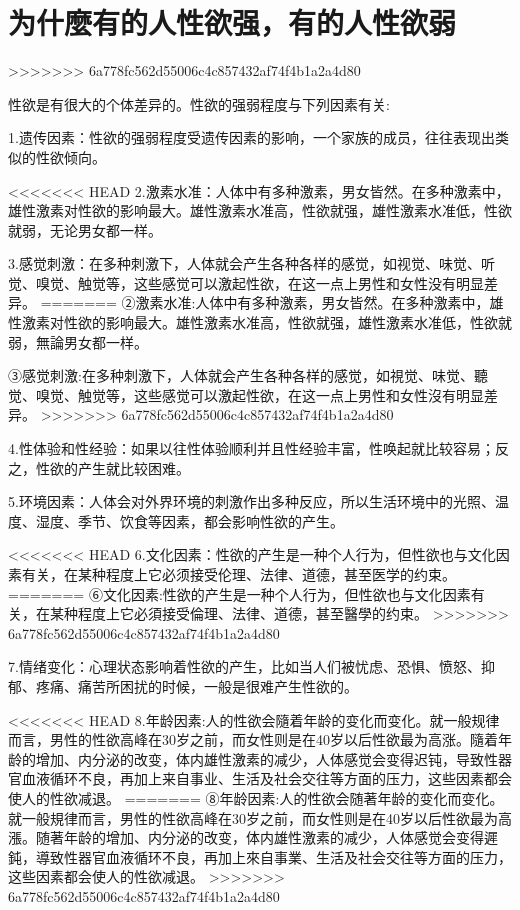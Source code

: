 \documentclass[12pt,UTF8]{ctexbook}
\begin{document}
\section{为什麼有的人性欲强，有的人性欲弱}
>>>>>>> 6a778fc562d55006c4c857432af74f4b1a2a4d80

性欲是有很大的个体差异的。性欲的强弱程度与下列因素有关:

1.遗传因素：性欲的强弱程度受遗传因素的影响，一个家族的成员，往往表现出类似的性欲倾向。

<<<<<<< HEAD
2.激素水准：人体中有多种激素，男女皆然。在多种激素中，雄性激素对性欲的影响最大。雄性激素水准高，性欲就强，雄性激素水准低，性欲就弱，无论男女都一样。

3.感觉刺激：在多种刺激下，人体就会产生各种各样的感觉，如视觉、味觉、听觉、嗅觉、触觉等，这些感觉可以激起性欲，在这一点上男性和女性没有明显差异。
=======
②激素水准:人体中有多种激素，男女皆然。在多种激素中，雄性激素对性欲的影响最大。雄性激素水准高，性欲就强，雄性激素水准低，性欲就弱，無論男女都一样。

③感觉刺激:在多种刺激下，人体就会产生各种各样的感觉，如視觉、味觉、聽觉、嗅觉、触觉等，这些感觉可以激起性欲，在这一点上男性和女性沒有明显差异。
>>>>>>> 6a778fc562d55006c4c857432af74f4b1a2a4d80

4.性体验和性经验：如果以往性体验顺利并且性经验丰富，性唤起就比较容易；反之，性欲的产生就比较困难。

5.环境因素：人体会对外界环境的刺激作出多种反应，所以生活环境中的光照、温度、湿度、季节、饮食等因素，都会影响性欲的产生。

<<<<<<< HEAD
6.文化因素：性欲的产生是一种个人行为，但性欲也与文化因素有关，在某种程度上它必须接受伦理、法律、道德，甚至医学的约束。
=======
⑥文化因素:性欲的产生是一种个人行为，但性欲也与文化因素有关，在某种程度上它必須接受倫理、法律、道德，甚至醫學的约束。
>>>>>>> 6a778fc562d55006c4c857432af74f4b1a2a4d80

7.情绪变化：心理状态影响着性欲的产生，比如当人们被忧虑、恐惧、愤怒、抑郁、疼痛、痛苦所困扰的时候，一般是很难产生性欲的。

<<<<<<< HEAD
8.年龄因素:人的性欲会隨着年龄的变化而变化。就一般规律而言，男性的性欲高峰在30岁之前，而女性则是在40岁以后性欲最为高涨。隨着年龄的增加、内分泌的改变，体内雄性激素的减少，人体感觉会变得迟钝，导致性器官血液循环不良，再加上来自事业、生活及社会交往等方面的压力，这些因素都会使人的性欲减退。
=======
⑧年龄因素:人的性欲会随著年龄的变化而变化。就一般規律而言，男性的性欲高峰在30岁之前，而女性则是在40岁以后性欲最为高漲。随著年龄的增加、内分泌的改变，体内雄性激素的减少，人体感觉会变得遲鈍，導致性器官血液循环不良，再加上來自事業、生活及社会交往等方面的压力，这些因素都会使人的性欲减退。
>>>>>>> 6a778fc562d55006c4c857432af74f4b1a2a4d80
\end{document}
